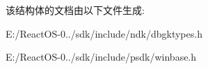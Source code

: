该结构体的文档由以下文件生成\+:\begin{DoxyCompactItemize}
\item 
E\+:/\+React\+O\+S-\/0../sdk/include/ndk/dbgktypes.\+h\item 
E\+:/\+React\+O\+S-\/0../sdk/include/psdk/winbase.\+h\end{DoxyCompactItemize}
